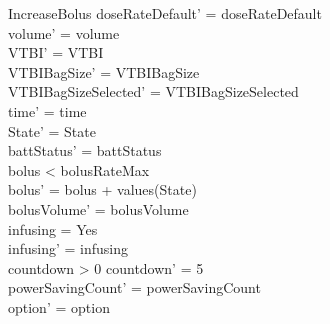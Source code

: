 \begin{schema}{IncreaseBolus}
	doseRateDefault' = doseRateDefault\\
	\pagebreak
	volume' = volume\\
	VTBI' = VTBI\\
	VTBIBagSize' = VTBIBagSize\\ VTBIBagSizeSelected' = VTBIBagSizeSelected\\
	time' = time\\ State' = State\\
	battStatus' = battStatus\\
	bolus < bolusRateMax\\
	bolus' = bolus + values(State)\\
	bolusVolume' = bolusVolume\\
	infusing = Yes\\
	infusing' = infusing\\
	countdown > 0 \land countdown' = 5\\
	powerSavingCount' = powerSavingCount\\ option' = option\\
\end{schema}

